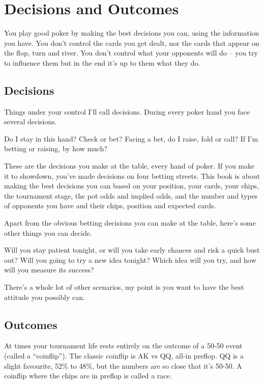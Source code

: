 \chapter{Decisions and Outcomes}


You play good poker by making the best decisions you can,
using the information you have. You don't control the cards
you get dealt, nor the cards that appear on the flop, turn and river.
You don't control what your opponents will do -- you try to influence
them but in the end it's up to them what they do.


\section{Decisions}

Things under your control I'll call decisions. During
every poker hand you face several decisions.

Do I stay in this hand? Check or bet? Facing a bet, do I
raise, fold or call? If I'm betting or raising, by how much?

These are the decisions you make at the table, every hand
of poker. If you make it to showdown, you've made decisions on four
betting streets. This book is about making the best
decisions you can based on your position, your cards, your chips,
the tournament stage, the pot odds and implied odds, and the number
and types of opponents you have and their chips, position and
expected cards.

Apart from the obvious betting decisions you can make at the table,
here's some other things you can decide.

Will you stay patient tonight, or will you take early chances and risk
a quick bust out? Will you going to try a new idea tonight? Which idea
will you try, and how will you measure its success?

There's a whole lot of other scenarios, my point is you want to have
the best attitude you possibly can.

\section{Outcomes}

At times your tournament life rests entirely on the outcome of
a 50-50 event (called a ``coinflip'').
The classic coinflip is AK vs QQ, all-in preflop. QQ is a slight
favourite, 52\% to 48\%, but the numbers are so close that it's 50-50.
A coinflip where the chips are in preflop is called a race.

